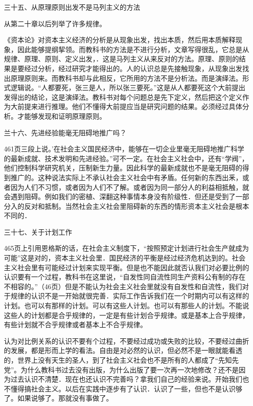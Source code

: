 三十五、从原理原则出发不是马列主义的方法

从第二十章以后列举了许多规律。

《资本论》对资本主义经济的分析是从现象出发，找出本质，然后用本质解释现象，因此能够提纲挈领。而教科书的方法是不进行分析，文章写得很乱，它总是从规律、原理、原则、定义出发，．这是马列主义从来反对的方法。原理、原则的结果是要经过分析，经过研究才能得出的。人的认识总是先接触现象，从现象出发找出原理原则来。而教科书却与此相反，它所用的方法不是分析法。而是演绎法。形式逻辑说。“人都要死，张三是人，所以张三要死。”这是从人都要死这个大前提出发得出的结论，这是演绎法。教科书对每个问题总是先下定义，然后把这个定义作为大前提来进行推理。他们不懂得大前提应当是研究问题的结果。必须经过具体分析。才能够发现和证明原理原则。

兰十六、先进经验能毫无阻碍地推广吗？

461页三段上说。’在社会主义国民经济中，能够在一切企业里毫无阻碍地推广科学的最新成就、技术发明和先进经验。”可不一定。在社会主义社会中，还有“学阀”，他们控制科学研究机关，压制新生力量。因此科学的最新成就也不是毫无阻碍的得到推广的。这种说法实际上不承认社会主义社会中有矛盾。任何新的东西出釆，或者因为人们不习惯，或者因为人们不了解。或者因为同一部分人的利益相抵触，就会遇到阻碍。例如我们的密植、深翻这种事情本身没有阶级性．但还是受到了一部分入的反对和抵制。当然社会主义社会里阻碍新的东西的情形资本主义社会是根本不同的．

三十七、关于计划工作

465页上引用恩格斯的话，在社会主义制度下，“按照预定计划进行社会生产就成为可能”这是对的，资本主义社会里．国民经济的平衡是经过经济危机达到的。社会主义社会里有可能经过计划来实现平衡。但是也不能因此就否认我们对必要比例的认识要有一个过程，教科书在这里说，“自发性同自流性同生产资料公有制的存在不相容的。”（46页）但是不能认为社会主义社会里就没有自发性和自流性，我们对于规律的认识不是一开始就很完善．实际工作告诉我们在一个时期内可以有这样的计划。也可以有那样的计划。可以有这些人计划。也可以有那些人的计划。不能说这些人的计划都是合乎规律的，一定是有些计划合乎规律。或是基本上合乎规律，有些计划就不合乎规律或者基本上不合乎规律。

认为对比例关系的认识不要有个过程，不要经过成功或失败的比较，不要经过曲折的发展，都是形而上学的看法。自由是对必然的认识，但必然不是一眼就能看透的，世界上没有天生的圣人，到了社会主义社会也不是所有的人都成了“先知先党”。为什么教科书过去没有出版，为什么出版了要一次再一次地修改？还不是因为过去认识不清楚．现在也还认识不完善吗？拿我们自己的经验来说。开始我们也不懂得搞社会主义。以后在实践中逐步有了认识．认识了一些，但也不是认识够了。如果说够了。那就没有事做了。

